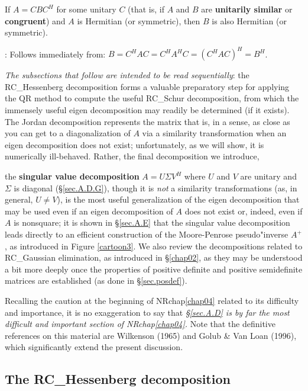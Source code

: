 \begin{fact} \label{fact.A.D.B}
If $A=CBC^{H}$ for some unitary $C$ (that is,
if $A$ and $B$ are {\bf unitarily similar} or {\bf congruent}) and $A$ is Hermitian (or
symmetric), then $B$ is also Hermitian (or symmetric).
\end{fact}

\/: Follows immediately from:
$B=C^{H}A C=C^{H}A^{H} C=(C^{H}A C)^{H}=B^{H}$. \endproof \medskip

{\it The subsections that follow are intended to be read sequentially}: the RC_Hessenberg
decomposition forms a valuable preparatory step for applying the QR
method to compute the useful RC_Schur decomposition, from which the immensely useful
eigen decomposition may readily be determined (if it exists).  The Jordan decomposition
represents the matrix that is, in a sense, as close as you can get to a diagonalization of $A$
via a similarity transformation when an eigen decomposition does not exist; unfortunately, as we will
show, it is numerically ill-behaved.  Rather, the final decomposition we introduce, 
\beginmylistb
\item the {\bf singular value decomposition} $A=U \Sigma V^H$ where $U$ and $V$ are unitary and $\Sigma$ is diagonal (\S \ref{sec.A.D.G}),
\endmylist
though it is {\it not} a similarity transformations (as, in general, $U\ne V$), is the most useful
generalization of the eigen decomposition that may be used even
if an eigen decomposition of $A$ does not exist or, indeed, even if $A$ is nonsquare;
it is shown in \S \ref{sec.A.E} that the singular value decomposition leads directly
to an efficient construction of the Moore-Penrose pseudo"inverse $A^+$, as introduced in Figure \ref{cartoon3}.
We also review the decompositions related to RC_Gaussian elimination, as introduced in \S \ref{chap02}, as they may
be understood a bit more deeply once the properties of positive definite and positive semidefinite
matrices are established (as done in \S \ref{sec.posdef}).  

Recalling the caution at the beginning of NRchap\ref{chap04} related to its difficulty and importance, it is no exaggeration to say that
{\it \S \ref{sec.A.D} is by far the most difficult and important section of NRchap\ref{chap04}.}  Note that the definitive references on this material
are Wilkenson (1965) and Golub \& Van Loan (1996), which significantly extend the present discussion.

\clearpage

\subsection{The RC_Hessenberg decomposition}\label{sec.A.D.A}

